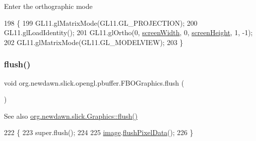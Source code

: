 Enter the orthographic mode 
\begin{DoxyCode}
198                                 \{
199         GL11.glMatrixMode(GL11.GL\_PROJECTION);
200         GL11.glLoadIdentity();
201         GL11.glOrtho(0, \mbox{\hyperlink{classorg_1_1newdawn_1_1slick_1_1_graphics_adbb4b10050a8bcf8e496130509784f71}{screenWidth}}, 0, \mbox{\hyperlink{classorg_1_1newdawn_1_1slick_1_1_graphics_a24cd14275ad2dcd82fcd843ceab6a80b}{screenHeight}}, 1, -1);
202         GL11.glMatrixMode(GL11.GL\_MODELVIEW);
203     \}
\end{DoxyCode}
\mbox{\label{classorg_1_1newdawn_1_1slick_1_1opengl_1_1pbuffer_1_1_f_b_o_graphics_ac288010f13cfdf0797b9c331dc85607c}} 
\subsubsection{\texorpdfstring{flush()}{flush()}}
{\footnotesize\ttfamily void org.\+newdawn.\+slick.\+opengl.\+pbuffer.\+F\+B\+O\+Graphics.\+flush (\begin{DoxyParamCaption}{ }\end{DoxyParamCaption})\hspace{0.3cm}{\ttfamily [inline]}}

\begin{DoxySeeAlso}{See also}
\mbox{\hyperlink{classorg_1_1newdawn_1_1slick_1_1_graphics_aef2136ee874864cef4886ad15485b79f}{org.\+newdawn.\+slick.\+Graphics\+::flush()}} 
\end{DoxySeeAlso}

\begin{DoxyCode}
222                         \{
223         super.flush();
224         
225         \mbox{\hyperlink{classorg_1_1newdawn_1_1slick_1_1opengl_1_1pbuffer_1_1_f_b_o_graphics_a7c88e67ddd520ec76bdc0082285ae909}{image}}.\mbox{\hyperlink{classorg_1_1newdawn_1_1slick_1_1_image_ae8ba5dcbbaef48c9ee618f8c68aa1b12}{flushPixelData}}();
226     \}
\end{DoxyCode}
\mbox{\label{classorg_1_1newdawn_1_1slick_1_1opengl_1_1pbuffer_1_1_f_b_o_graphics_a7ddf1bb9199f2c1e45ff29e5604904b7}} 
